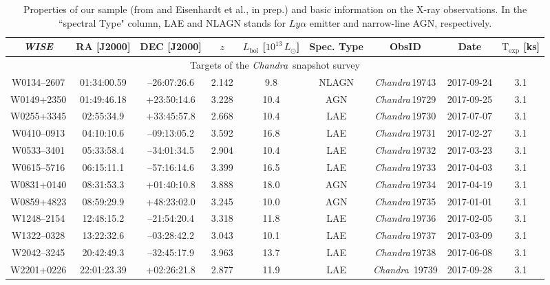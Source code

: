 \documentclass[useAMS,usenatbib]{mnras}
\newcommand*{\chandra}{\textit{Chandra}}
\begin{document}
\begin{table*}
	\caption{ Properties of our sample (from \citealt{Tsai15} and Eisenhardt et al., in prep.) and basic information on the X-ray observations. In the ``spectral Type" column, LAE and NLAGN stands for $Ly\alpha$ emitter and narrow-line AGN, respectively.}\label{obs_tab}
	\begin{tabular}{ccccccccc}
		\hline
		\multicolumn{1}{c}{\textit{WISE}} &
		\multicolumn{1}{c}{RA [J2000]} &
		\multicolumn{1}{c}{DEC [J2000]}& 
		\multicolumn{1}{c}{$z$}&
		\multicolumn{1}{c}{$L_{\mathrm{bol}}$ [$10^{13}\,L_\odot$]}& 
		\multicolumn{1}{c}{Spec. Type}& 
		\multicolumn{1}{c}{ObsID}& 		
		\multicolumn{1}{c}{Date}&
		\multicolumn{1}{c}{$\mathrm{T_{exp}}$ [ks]}\\
		\hline
		\multicolumn{9}{c}{Targets of the \chandra\, snapshot survey}\\
		W0134--2607 & 01:34:00.59 & --26:07:26.6 & 2.142 & 9.8 & NLAGN &  \chandra\,19743 & 2017-09-24 & 3.1\\
		W0149+2350 & 01:49:46.18 & +23:50:14.6 & 3.228 & 10.4 & AGN &  \chandra\,19729 & 2017-09-25 & 3.1\\
		W0255+3345 & 02:55:34.9 & +33:45:57.8 & 2.668 & 10.4& LAE &  \chandra\,19730& 2017-07-07 & 3.1\\
		W0410--0913  & 04:10:10.6  &  --09:13:05.2 & 3.592  &  16.8& LAE & \chandra\,19731  & 2017-02-27& 3.1\\
		W0533--3401  & 05:33:58.4 & --34:01:34.5 & 2.904& 10.4 & LAE &   \chandra\,19732 &2017-03-23 & 3.1\\
		W0615--5716  & 06:15:11.1  &  --57:16:14.6  & 3.399 &  16.5 & LAE &  \chandra\,19733  & 2017-04-03& 3.1\\
		W0831+0140 & 08:31:53.3 &  +01:40:10.8 & 3.888& 18.0 & AGN &   \chandra\,19734& 2017-04-19 & 3.1\\
		W0859+4823 & 08:59:29.9 & +48:23:02.0 &3.245 & 10.0 &AGN &  \chandra\,19735 & 2017-01-01 & 3.1\\
		W1248--2154 & 12:48:15.2  & --21:54:20.4 &  3.318 &  11.8& LAE &  \chandra\,19736 & 2017-02-05& 3.1\\
		W1322--0328 & 13:22:32.6 & --03:28:42.2 & 3.043 & 10.1&  LAE & \chandra\,19737 & 2017-03-09& 3.1\\
		W2042--3245 & 20:42:49.3 & --32:45:17.9 & 3.963 & 13.7& LAE & \chandra\,19738  & 2017-06-08& 3.1\\
		W2201+0226 & 22:01:23.39 & +02:26:21.8 & 2.877 & 11.9 & LAE & \chandra\, 19739     & 2017-09-28  & 3.1\\

\end{tabular}
\end{table*}
\end{document}

